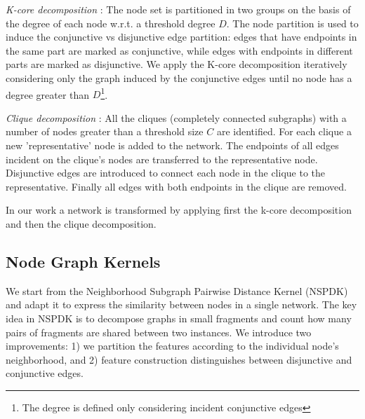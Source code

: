 \documentclass{esannV2}
\begin{document}
\textit{K-core decomposition} \cite{kcore}: The node set is partitioned in two groups on the basis of the degree of each node w.r.t. a threshold degree $D$. The node partition is used to induce the conjunctive vs disjunctive edge partition: edges that have endpoints in the same part are marked as conjunctive, while edges with endpoints in different parts are marked as disjunctive. We apply the K-core decomposition iteratively considering only the graph induced by the conjunctive edges until no node has a degree greater
than $D$\footnote{The degree is defined only considering incident conjunctive edges}.

\textit{Clique decomposition} \cite{clique}:   All the cliques (completely connected subgraphs) with a number of nodes greater than a threshold size $C$ are identified. For each clique a new 'representative' node is added to the network. The endpoints of all edges incident on the clique's nodes are transferred to the representative node. Disjunctive edges are introduced to connect each node in the clique to the representative. Finally all edges with both endpoints in the clique are removed.

In our work a network is transformed by applying first the k-core decomposition and then the clique decomposition.

\subsection{Node Graph Kernels} 
We start from the Neighborhood Subgraph Pairwise Distance Kernel (NSPDK) \cite{nspdk} and adapt it to express the similarity between nodes in a single network. The key idea in NSPDK is to decompose graphs in small fragments and count how many pairs of fragments are shared between two instances. We introduce two improvements: 1) we partition the features according to the individual node's neighborhood, and 2) feature construction distinguishes between disjunctive and conjunctive edges.
\end{document}
